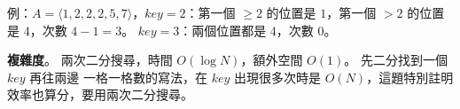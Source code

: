 \begin{pastsoln}
例：$A = \langle 1, 2, 2, 2, 5, 7\rangle$，$\mathit{key} = 2$：第一個 $\ge 2$ 的位置是 $1$，第一個 $> 2$ 的位置
是 $4$，次數 $4 - 1 = 3$。 $\mathit{key} = 3$：兩個位置都是 $4$，次數 $0$。

\textbf{複雜度}。 兩次二分搜尋，時間 $O(\log N)$，額外空間 $O(1)$。 先二分找到一個 $\mathit{key}$ 再往兩邊
一格一格數的寫法，在 $\mathit{key}$ 出現很多次時是 $O(N)$，這題特別註明效率也算分，要用兩次二分搜尋。
\end{pastsoln}
